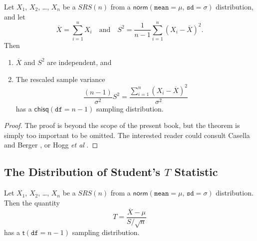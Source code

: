 \documentclass[captions=tableheading]{scrbook}
\begin{document}
\begin{thm}
\label{thm:Xbar-andS}
Let \(X_{1}\), \(X_{2}\), \ldots{}, \(X_{n}\) be a \(SRS(n)\) from a \(\mathsf{norm}(\mathtt{mean}=\mu,\,\mathtt{sd}=\sigma)\) distribution, and let
\begin{equation}
\overline{X}=\sum_{i=1}^{n}X_{i}\quad\mbox{and}\quad S^{2}=\frac{1}{n-1}\sum_{i=1}^{n}(X_{i}-\overline{X})^{2}.
\end{equation}
Then
\begin{enumerate}
\item \(\overline{X}\) and \(S^{2}\) are independent, and
\item The rescaled sample variance
    \begin{equation}
    \frac{(n-1)}{\sigma^{2}}S^{2}=\frac{\sum_{i=1}^{n}(X_{i}-\overline{X})^{2}}{\sigma^{2}}
    \end{equation}
    has a \(\mathsf{chisq}(\mathtt{df}=n-1)\) sampling distribution.
\end{enumerate}
\end{thm}

\begin{proof}
The proof is beyond the scope of the present book, but the theorem is simply too important to be omitted. The interested reader could consult Casella and Berger \cite{Casella2002}, or Hogg \emph{et al} \cite{Hogg2005}. 
\end{proof}
\subsection{The Distribution of Student's \(T\) Statistic}
\label{sec-8-2-3}

\label{sub:Student's-t-Distribution}

\begin{prop}
Let \(X_{1}\), \(X_{2}\), \ldots{}, \(X_{n}\) be a \(SRS(n)\) from a \(\mathsf{norm}(\mathtt{mean}=\mu,\,\mathtt{sd}=\sigma)\) distribution. Then the quantity 
\begin{equation}
T=\frac{\overline{X}-\mu}{S/\sqrt{n}}
\end{equation}
has a \(\mathsf{t}(\mathtt{df}=n-1)\) sampling distribution.
\end{prop}
\end{document}
